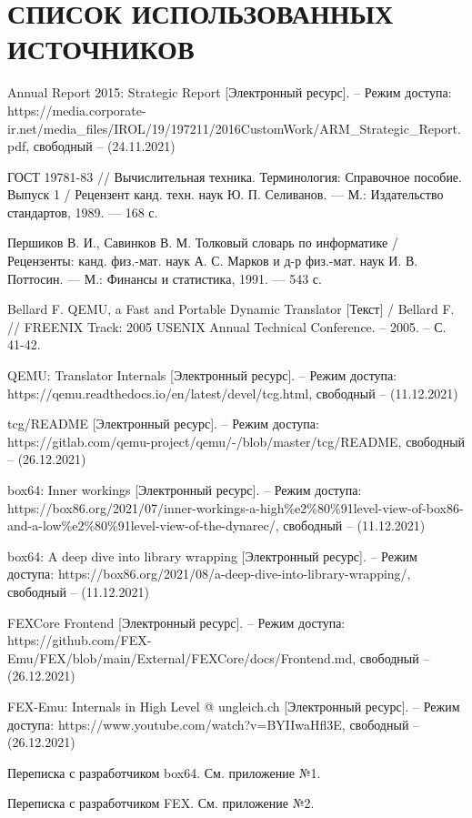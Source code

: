 \section*{СПИСОК ИСПОЛЬЗОВАННЫХ ИСТОЧНИКОВ}

\begingroup
\renewcommand{\section}[2]{}
\begin{thebibliography}{}
	Annual Report 2015: Strategic Report [Электронный ресурс]. – Режим доступа: https://media.corporate-ir.net/media\_files/IROL/19/197211/2016CustomWork/ARM\_Strategic\_Report.pdf,
	свободный – (24.11.2021)
		
	 ГОСТ 19781-83 // Вычислительная техника. Терминология: Справочное пособие. Выпуск 1 / Рецензент канд. техн. наук Ю. П. Селиванов. — М.: Издательство стандартов, 1989. — 168 с.
	 
	  Першиков В. И., Савинков В. М. Толковый словарь по информатике / Рецензенты: канд. физ.-мат. наук А. С. Марков и д-р физ.-мат. наук И. В. Поттосин. — М.: Финансы и статистика, 1991. — 543 с.
	
	Bellard F. QEMU, a Fast and Portable Dynamic Translator [Текст]  / Bellard F. // FREENIX Track: 2005 USENIX Annual Technical Conference. – 2005. – С. 41-42.
	
QEMU: Translator Internals [Электронный ресурс]. – Режим доступа: https://qemu.readthedocs.io/en/latest/devel/tcg.html,
свободный – (11.12.2021)

	tcg/README  [Электронный ресурс]. – Режим доступа: https://gitlab.com/qemu-project/qemu/-/blob/master/tcg/README,
свободный – (26.12.2021)


box64: Inner workings [Электронный ресурс]. – Режим доступа: https://box86.org/2021/07/inner-workings-a-high\%e2\%80\%91level-view-of-box86-and-a-low\%e2\%80\%91level-view-of-the-dynarec/,
свободный – (11.12.2021)

box64: A deep dive into library wrapping [Электронный ресурс]. – Режим доступа: https://box86.org/2021/08/a-deep-dive-into-library-wrapping/,
свободный – (11.12.2021)

	FEXCore Frontend [Электронный ресурс]. – Режим доступа: 	https://github.com/FEX-Emu/FEX/blob/main/External/FEXCore/docs/Frontend.md,
	свободный – (26.12.2021)
	
	 FEX-Emu: Internals in High Level @ ungleich.ch [Электронный ресурс]. – Режим доступа: 		https://www.youtube.com/watch?v=BYIIwaHfl3E,
	 свободный – (26.12.2021)

	Переписка с разработчиком box64. См. приложение №1.
	
	Переписка с разработчиком FEX. См. приложение №2.
\end{thebibliography}
\endgroup

\pagebreak